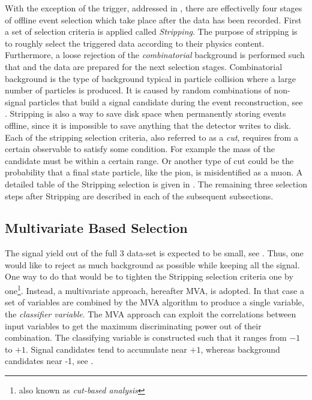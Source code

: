 
With the exception of the trigger, addressed in , there are effectivelly four stages of offline event
selection which take place after the data has been recorded.
First a set of selection criteria is applied called {\it Stripping}. The purpose of stripping is to roughly
select the triggered data according to their physics content. Furthermore, a loose rejection of the {\it combinatorial}
background is performed such that and the data are prepared for the next selection stages.
Combinatorial background is the type of background typical in particle collision where a large number of
particles is produced. It is caused by random combinations of non-signal particles that build a signal
candidate during the event reconstruction, see .
Stripping is also a way to save disk space when permanently storing events offline, since it is impossible to save anything
that the detector writes to disk. Each of the stripping selection criteria, also referred to as a {\it cut},
requires from a certain observable to satisfy some condition. For example the mass of the \Bs candidate must be within
a certain range. Or another type of cut could be the probability that a final state particle, like the pion, is misidentified
as a muon. A detailed table of the Stripping selection is given in . The remaining three selection
steps after Stripping are described in each of the subsequent subsections.

\subsection{Multivariate Based Selection}
\label{Multivariate_Based_Selection}

The \BsJpsiKst signal yield out of the full 3 \invfb data-set is expected to be small, see . Thus, one would like to
reject as much background as possible while keeping all the signal. One way to do that would be to tighten the Stripping selection criteria
one by one\footnote{also known as {\it cut-based analysis}}. Instead, a multivariate approach, hereafter MVA, is adopted.
In that case a set of variables are combined by the MVA algorithm to produce a single variable, the {\it classifier variable}.
The MVA approach can exploit the correlations between input variables to get the maximum discriminating power out of their combination.
The classifying variable is constructed such that it ranges from $-1$ to $+1$. Signal candidates tend to accumulate near $+1$,
whereas background candidates near -1, see .

